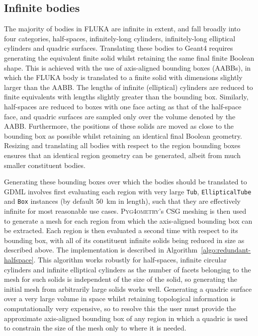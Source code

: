 \documentclass[preprint,12pt]{elsarticle}
\newcommand{\pyinline}[1]{\lstinline[postbreak={}]{#1}}
\newcommand{\PYGEOMETRY}{\textsc{Pyg4ometry}}
\begin{document}
\subsection{Infinite bodies}
The majority of bodies in FLUKA are infinite in extent, and fall
broadly into four categories, half-spaces, infinitely-long cylinders,
infinitely-long elliptical cylinders and quadric surfaces.
Translating these bodies to Geant4 requires generating the equivalent
finite solid whilst retaining the same final finite Boolean shape.
This is achieved with the use of axis-aligned bounding boxes (AABBs),
in which the FLUKA body is translated to a finite solid with 
dimensions slightly larger than the AABB.  The lengths of infinite
(elliptical) cylinders are reduced to finite equivalents with lengths
slightly greater than the bounding box.  Similarly, half-spaces are
reduced to boxes with one face acting as that of the half-space face,
and quadric surfaces are sampled only over the volume denoted by the
AABB.  Furthermore, the positions of these solids are moved as close
to the bounding box as possible whilst retaining an identical final
Boolean geometry.   Resizing and translating all bodies with respect
to the region bounding boxes ensures that an identical region geometry can
be generated, albeit from much smaller constituent bodies.

Generating these bounding boxes over which the bodies should be translated
to GDML involves first evaluating each region with very large \pyinline{Tub},
\pyinline{EllipticalTube} and \pyinline{Box} instances (by default
\SI{50}{\km} in length), such that they are effectively infinite for most
reasonable use cases.  \PYGEOMETRY{}'s CSG meshing is then used to generate
a mesh for each region from which the axis-aligned bounding box can be
extracted.  Each region is then evaluated a second time with respect to its
 bounding box, with all of its constituent infinite solids being
reduced in size as described above.  The implementation is described in
Algorithm~\ref{algo:redundant-halfspace}. This algorithm works robustly for
half-spaces, infinite circular cylinders and infinite elliptical cylinders
as the number of facets belonging to the mesh for such solids is
independent of the size of the solid, so generating the initial mesh from
arbitrarily large solids works well.  Generating a quadric surface over a very large
volume in space whilst retaining topological information is computationally
very expensive, so to resolve this the user must provide the approximate
axis-aligned bounding box of any region in which a quadric is used to
constrain the size of the mesh only to where it is needed.
\end{document}
